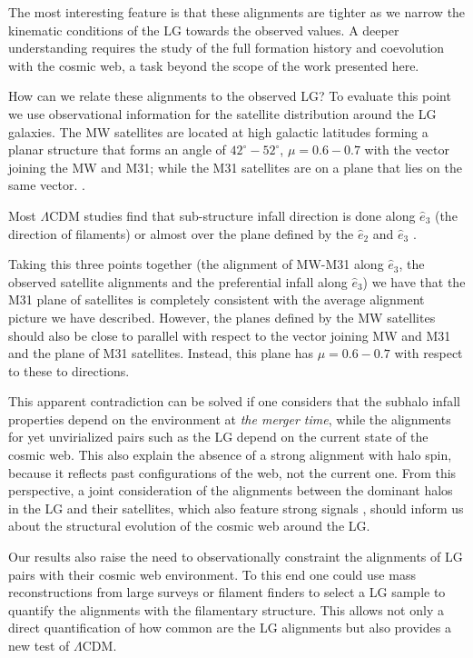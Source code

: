 \documentclass{emulateapj}
\begin{document}
The most interesting feature is that these alignments are
tighter as we narrow the kinematic conditions of the LG towards the
observed values. A deeper understanding requires the study of the full
formation history and coevolution with the cosmic web, a task beyond
the scope of the work presented here.

How can we relate these alignments to the observed LG? 
To evaluate this point we use observational information for the
satellite distribution around the LG galaxies.  The MW satellites are
located at high galactic latitudes forming a planar structure that
forms an angle of $42^{\circ}-52^{\circ}$, $\mu=0.6-0.7$ with the
vector joining the MW and M31; while the M31 satellites are on a plane
that lies on the same vector. \citep{Pawloski2013,Shaya2013}. 

Most $\Lambda$CDM studies find that sub-structure infall direction is
done along $\hat{e}_{3}$ (the direction of filaments)
\citep{2005ApJ...629..219Z,2008MNRAS.390.1133B} or almost over the plane
defined by the $\hat{e}_2$ and $\hat{e}_3$ \cite{2014MNRAS.443.1274L}.  

Taking this three points together (the alignment of MW-M31 along
$\hat{e}_3$, the observed satellite alignments and the preferential
infall along $\hat{e}_3$) we have that the M31 plane of satellites is
completely consistent with the average alignment picture we have
described. However, the planes defined by the MW satellites should
also be close to parallel with respect to the vector joining MW and
M31 and the plane of M31 satellites. Instead, this plane has
$\mu=0.6-0.7$ with respect to these to directions. 

This apparent contradiction can be solved if one considers that the
subhalo infall properties depend on the environment at {\it the
  merger time}, while the alignments for yet unvirialized pairs such as the LG
depend on the current state of the cosmic web. This also explain the absence
of a strong alignment with halo spin, because it reflects past
configurations of the web, not the current one. From this perspective,
a joint consideration of the alignments between the dominant
halos in the LG and their satellites, which also feature strong
signals \citep{2005A&A...431..517,Pawloski2013,Shaya2013}, should
inform us about the structural evolution of the cosmic web around the
LG.   

Our results also raise the need to observationally constraint the
alignments of LG pairs with their cosmic web environment. To this end one could use mass reconstructions from large surveys
\citep{2009MNRAS.394..398W,2011MNRAS.417.1303M,2014arXiv1407.3451W,2014arXiv1406.1004N}
or filament finders \citep{2010MNRAS.407.1449G,2011MNRAS.414..350S}
to select a LG sample to quantify the alignments with the filamentary
structure. 
This allows not only a direct quantification of how common are the LG
alignments but also provides a new test of $\Lambda$CDM. 
\end{document}
